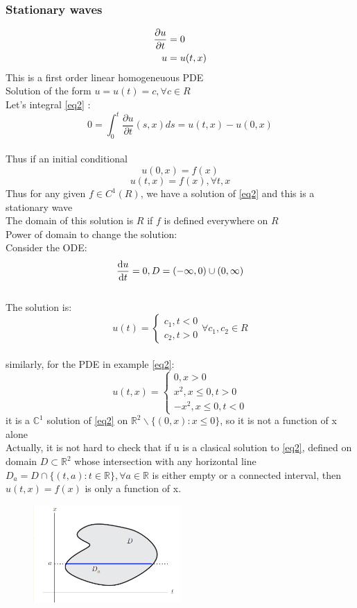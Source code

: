 \subsubsection{Stationary waves}
\begin{align}
    \label{eq2} \pdv{u}{t}&=0
    \\u&=u(t,x)
\end{align}
This is a first order linear homogeneuous PDE
\\Solution of the form $u=u(t)=c, \forall c \in R$
\\Let's integral \eqref{eq2} :
\[ 0=\int_{0}^{t}\frac{\partial u}{\partial t}(s,x)ds=u(t,x)-u(0,x)\]
\\Thus if an initial conditional
\[u(0,x)=f(x)\]
\[u(t,x)=f(x), \forall t,x\] 
Thus for any given $f \in C^1(R)$, we have a solution of \eqref{eq2} and this is a stationary wave
\\The domain of this solution is $R$ if $f$ is defined everywhere on $R$
\\Power of domain to change the solution:
\\Consider the ODE:
$$\dv{u}{t}=0, D=(-\infty,0)\cup(0,\infty) $$
\\The solution is:
\[
    u(t)=\begin{cases}
        c_1, t<0
        \\c_2, t>0
    \end{cases}
    \forall c_1,c_2 \in R
\]
\\similarly, for the PDE in example \eqref{eq2}:
$$
    u(t,x)=\begin{cases}
        0, x>0
        \\x^2, x\leq0,t>0
        \\-x^2, x\leq0,t<0
    \end{cases}
$$ 
it is a $ \mathbb{C}^1 $ solution of \eqref{eq2} on $ \mathbb{R}^2\backslash\{(0,x):x\leq0\} $, so it is not a function of x alone\\
Actually, it is not hard to check that if u is a clasical solution to \eqref{eq2}, defined on domain $ D\subset\mathbb{R}^2 $ whose intersection with any horizontal line $D_a=D\cap\{(t,a):t\in \mathbb{R}\},\forall a\in \mathbb{R}  $ is either empty or a connected interval, then $ u(t,x)=f(x) $ is only a function of x.
\begin{figure}[H]
    \centering
    \includegraphics[height = 0.4\textwidth, width = 0.5\textwidth]{resource/1.png}
\end{figure}
